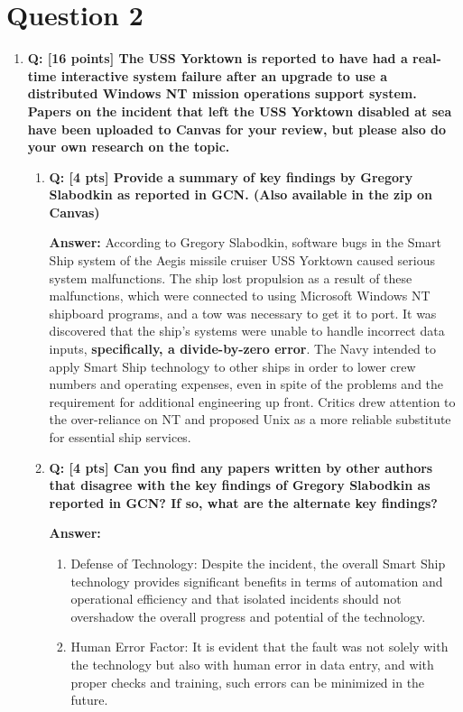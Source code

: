 \documentclass[a4paper,11pt]{article}%
\newenvironment{qanda}{\setlength{\parindent}{0pt}}{\bigskip}
\newcommand{\Q}{\bigskip\bfseries Q: }
\newcommand{\A}{\par\textbf{Answer: } \normalfont}
\begin{document}
\begin{qanda}
	\section{Question 2}
	\begin{enumerate}
		\item[] \Q [16 points] The USS Yorktown is reported to have had a real-time interactive system failure
			after an upgrade to use a distributed Windows NT mission operations support system. Papers
			on the incident that left the USS Yorktown disabled at sea have been uploaded to Canvas for
			your review, but please also do your own research on the topic.
			\begin{enumerate}
				\item \Q [4 pts] Provide a summary of key findings by Gregory Slabodkin as reported in GCN.
				      (Also available in the zip on Canvas)
				      \A According to Gregory Slabodkin, software bugs in the Smart Ship system of the Aegis missile cruiser USS Yorktown caused serious system malfunctions. The ship lost propulsion as a result of these malfunctions, which were connected to using Microsoft Windows NT shipboard programs, and a tow was necessary to get it to port. It was discovered that the ship's systems were unable to handle incorrect data inputs, \textbf{specifically, a divide-by-zero error}. The Navy intended to apply Smart Ship technology to other ships in order to lower crew numbers and operating expenses, even in spite of the problems and the requirement for additional engineering up front. Critics drew attention to the over-reliance on NT and proposed Unix as a more reliable substitute for essential ship services.


				\item \Q [4 pts] Can you find any papers written by other authors that disagree with the key
				      findings of Gregory Slabodkin as reported in GCN? If so, what are the alternate key
				      findings?
				      \A
				      \begin{enumerate}
					      \item Defense of Technology: Despite the incident, the overall Smart Ship technology provides significant benefits in terms of automation and operational efficiency and that isolated incidents should not overshadow the overall progress and potential of the technology.

					      \item Human Error Factor: It is evident that the fault was not solely with the technology but also with human error in data entry, and with proper checks and training, such errors can be minimized in the future.


\end{enumerate}
\end{enumerate}
\end{enumerate}
\end{qanda}
\end{document}
